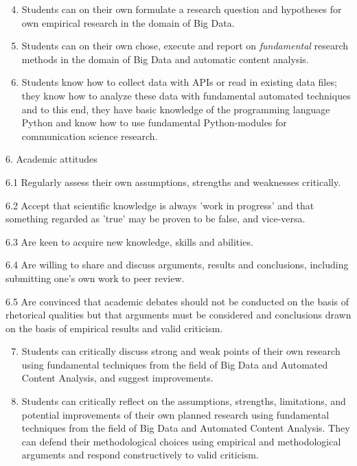 \begin{enumerate}[A]
\setcounter{enumi}{3}
\item Students can on their own formulate a research question and hypotheses for own empirical research in the domain of Big Data.
\item Students can on their own chose, execute and report on \emph{fundamental} research methods in the domain of Big Data and automatic content analysis.
\item Students know how to collect data with APIs or read in existing data files; they know how to analyze these data with fundamental automated techniques and to this end, they have basic knowledge of the programming language Python and know how to use fundamental Python-modules for communication science research.
\end{enumerate}

{\footnotesize{
6. Academic attitudes

6.1 Regularly assess their own assumptions, strengths and weaknesses critically.


6.2 Accept that scientific knowledge is always 'work in progress' and that something regarded as 'true' may be proven to be false, and vice-versa.


6.3 Are keen to acquire new knowledge, skills and abilities.


6.4 Are willing to share and discuss arguments, results and conclusions, including submitting one's own work to peer review.


6.5 Are convinced that academic debates should not be conducted on the basis of rhetorical qualities but that arguments must be considered and conclusions drawn on the basis of empirical results and valid criticism.

}}

\begin{enumerate}[A]
\setcounter{enumi}{6}
\item Students can critically discuss strong and weak points of their own research using fundamental techniques from the field of Big Data and Automated Content Analysis, and suggest improvements.
\item Students can critically reflect on the assumptions, strengths, limitations, and potential improvements of their own planned research using fundamental techniques from the field of Big Data and Automated Content Analysis. They can defend their methodological choices using empirical and methodological arguments and respond constructively to valid criticism.
\end{enumerate}
